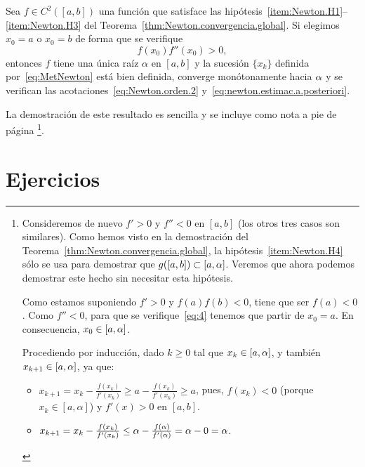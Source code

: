 \begin{corollary}
  Sea $f \in C^2([a,b])$ una función que satisface las
  hipótesis~\ref{item:Newton.H1}--\ref{item:Newton.H3} del
  Teorema~\ref{thm:Newton.convergencia.global}. Si elegimos $x_0=a$
  o $x_0=b$ de forma que se verifique
  \begin{equation}
    \label{eq:4}
    f(x_0) f''(x_0) > 0,
  \end{equation}
  entonces $f$ tiene una única raíz $\alpha$ en $[a,b]$ y la
  sucesión $\{x_k\}$ definida por~\eqref{eq:MetNewton} está bien
  definida, converge monótonamente hacia $\alpha$ y se verifican las
  acotaciones~\eqref{eq:Newton.orden.2}
  y~\eqref{eq:newton.estimac.a.posteriori}.
  \label{cor:regla.fourier}
\end{corollary}
La demostración de este resultado es sencilla y se incluye como nota a pie de página%
\footnote{
  Consideremos de nuevo $f'>0$ y $f''<0$ en $[a,b]$ (los otros tres
  casos son similares). Como hemos visto en la demostración del
  Teorema~\ref{thm:Newton.convergencia.global}, la
  hipótesis~\ref{item:Newton.H4} sólo se usa para demostrar que
  $g([a,b])\subset [a,\alpha]$. Veremos que ahora podemos demostrar
  este hecho sin necesitar esta hipótesis.

  Como estamos suponiendo $f'>0$ y $f(a)f(b)<0$, tiene que ser
  $f(a)<0$.
  Como $f''<0$, para que se verifique~\eqref{eq:4} tenemos que partir
  de $x_0=a$. En consecuencia, $x_0\in[a,\alpha]$.

  Procediendo por inducción, dado $k\ge 0$ tal que $x_k\in [a,\alpha]$, y
  también $x_{k+1}\in [a,\alpha]$, ya que:
  \begin{itemize}
  \item
    $x_{k+1}=x_k-\frac{f(x_k)}{f'(x_k)} \ge a - \frac{f(x_k)}{f'(x_k)}
    \ge a$,
    pues, $f(x_k) < 0$ (porque $x_k\in [a,\alpha]$) y
    $f'(x)>0$ en $[a,b]$.
  \item
    $x_{k+1}=x_k-\frac{f(x_k)}{f'(x_k)} \le
    \alpha-\frac{f(\alpha)}{f'(\alpha)}=\alpha-0 =\alpha$.
  \end{itemize}
}.

\section{Ejercicios}
\label{sec:ejercicios}

